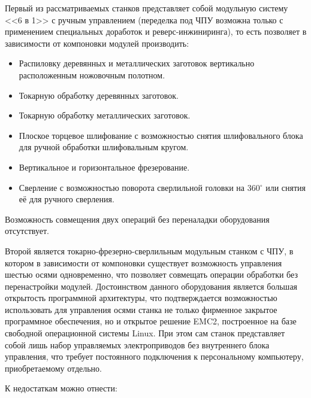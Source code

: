 Первый из рассматриваемых станков представляет собой модульную систему <<6 в 1>> с ручным управлением (переделка под ЧПУ возможна только с применением специальных доработок и реверс-инжиниринга), то есть позволяет в зависимости от компоновки модулей производить:

\begin{itemize}
	\item Распиловку деревянных и металлических заготовок вертикально расположенным ножовочным полотном.
	\item Токарную обработку деревянных заготовок.
	\item Токарную обработку металлических заготовок.
	\item Плоское торцевое шлифование с возможностью снятия шлифовального блока для ручной обработки шлифовальным кругом.
	\item Вертикальное и горизонтальное фрезерование.
	\item Сверление с возможностью поворота сверлильной головки на 360$^{\circ}$ или снятия её для ручного сверления.
\end{itemize}

Возможность совмещения двух операций без переналадки оборудования отсутствует.

Второй является токарно-фрезерно-сверлильным модульным станком с ЧПУ, в котором в зависимости от компоновки существует возможность управления шестью осями одновременно, что позволяет совмещать операции обработки без перенастройки модулей. Достоинством данного оборудования является большая открытость программной архитектуры, что подтверждается возможностью использовать для управления осями станка не только фирменное закрытое программное обеспечения, но и открытое решение EMC2, построенное на базе свободной операционной системы Linux. При этом сам станок представляет собой лишь набор управляемых электроприводов без внутреннего блока управления, что требует постоянного подключения к персональному компьютеру, приобретаемому отдельно.

К недостаткам можно отнести:

